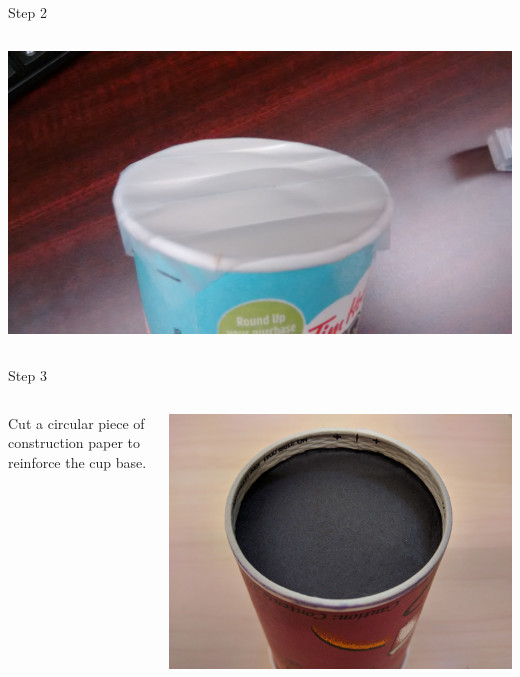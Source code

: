 \begin{frame}{Step 2}
\begin{columns}
\begin{column}{0.4\textwidth}
      \includegraphics[width=\textwidth,trim=4in 0 4in 0,clip]{media/coveredlid1.jpg}
    \end{column}
  \end{columns}
\end{frame}

\begin{frame}{Step 3}
  \begin{columns}
    \begin{column}{0.6\textwidth}
      Cut a circular piece of construction paper to reinforce the cup base.
    \end{column}
    \begin{column}{0.4\textwidth}
      \includegraphics[width=\textwidth]{media/cup-without-pin.jpg}
    \end{column}
  \end{columns}
  
\end{frame}


